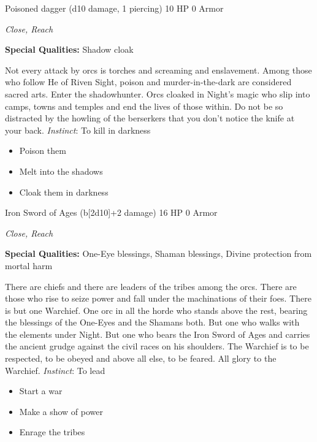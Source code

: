 Poisoned dagger (d10 damage, 1 piercing)\hspace*{\fill} 10 HP 0 Armor

\emph{Close, Reach}

\textbf{Special Qualities:}
Shadow cloak

\HRule
Not every attack by orcs is torches and screaming and enslavement. Among those who follow He of Riven Sight, poison and murder-in-the-dark are considered sacred arts. Enter the shadowhunter. Orcs cloaked in Night's magic who slip into camps, towns and temples and end the lives of those within. Do not be so distracted by the howling of the berserkers that you don't notice the knife at your back. \emph{Instinct}: To kill in darkness
\begin{itemize}
\item Poison them
\item Melt into the shadows
\item Cloak them in darkness
\end{itemize}
\newpage
\HRule
{}

Iron Sword of Ages (b[2d10]+2 damage)\hspace*{\fill} 16 HP 0 Armor

\emph{Close, Reach}

\textbf{Special Qualities:}
One-Eye blessings, Shaman blessings, Divine protection from mortal harm

\HRule
There are chiefs and there are leaders of the tribes among the orcs. There are those who rise to seize power and fall under the machinations of their foes. There is but one Warchief. One orc in all the horde who stands above the rest, bearing the blessings of the One-Eyes and the Shamans both. But one who walks with the elements under Night. But one who bears the Iron Sword of Ages and carries the ancient grudge against the civil races on his shoulders. The Warchief is to be respected, to be obeyed and above all else, to be feared. All glory to the Warchief. \emph{Instinct}: To lead
\begin{itemize}
\item Start a war
\item Make a show of power
\item Enrage the tribes
\end{itemize}

\HRule
{}

